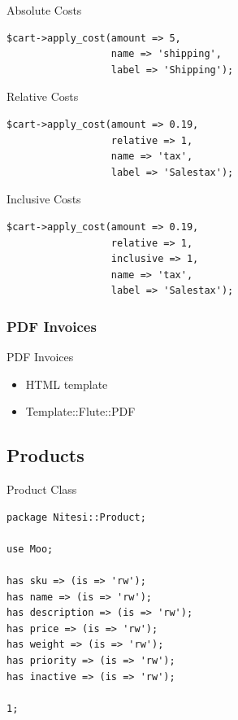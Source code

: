\begin{frame}[fragile]{Absolute Costs}
\begin{lstlisting}
$cart->apply_cost(amount => 5, 
                  name => 'shipping', 
                  label => 'Shipping');
\end{lstlisting}
\end{frame}

\begin{frame}[fragile]{Relative Costs}
\begin{lstlisting}
$cart->apply_cost(amount => 0.19, 
                  relative => 1, 
                  name => 'tax', 
                  label => 'Salestax');
\end{lstlisting}
\end{frame}

\begin{frame}[fragile]{Inclusive Costs}
\begin{lstlisting}
$cart->apply_cost(amount => 0.19, 
                  relative => 1, 
                  inclusive => 1, 
                  name => 'tax', 
                  label => 'Salestax');
\end{lstlisting}
\end{frame}

\subsubsection{PDF Invoices}
\begin{frame}{PDF Invoices}
\begin{itemize}
\item HTML template
\item Template::Flute::PDF
\end{itemize}
\end{frame}

\subsection{Products}
\begin{frame}[fragile]{Product Class}
\begin{lstlisting}
package Nitesi::Product;

use Moo;

has sku => (is => 'rw');
has name => (is => 'rw');
has description => (is => 'rw'); 
has price => (is => 'rw');
has weight => (is => 'rw');
has priority => (is => 'rw');
has inactive => (is => 'rw');

1;
\end{lstlisting}
\end{frame}


